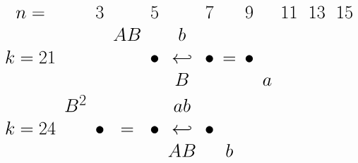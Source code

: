 \documentclass{article}
\begin{document}
\(
\begin{tikzcd}[nodes={font=\Huge},row sep=0.2cm,column sep=0.1cm]
n= & & 3 & & 5 & & 7 & & 9 & & 11 & & 13 &  & 15\\
 & & & AB & & b \\
k=21 & \text{} & \text{} & \text{} & \bullet & \hookleftarrow & \bullet & = & \bullet \\
& \text{} & \text{} & \text{} & \text{} & B & \text{}  & \text{}  & \text{} & a \\
& B^2 & \text{} & \text{} & \text{} & \text{} ab \\
k=24 & \text{} & \bullet & = & \bullet & \hookleftarrow & \bullet \\
 & \text{}  & \text{}  & \text{}  & \text{} & AB & \text{} & b 
\end{tikzcd}
\)
\end{document}
